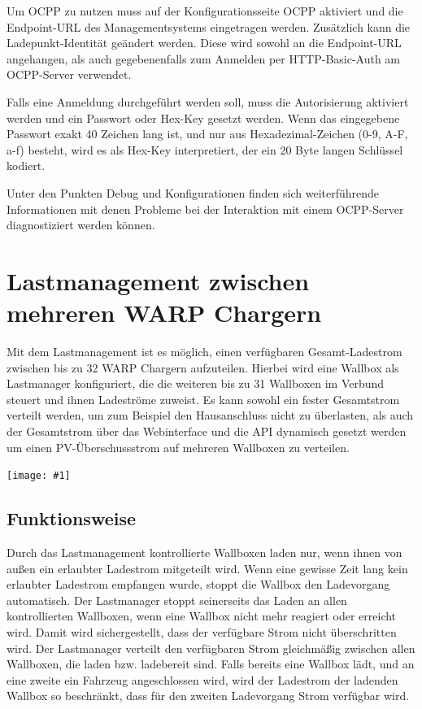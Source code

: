 \documentclass[a4paper,10pt]{article}
\newcommand{\gfx}[1]{\texttt{[image: \#1]}}
\begin{document}
\begin{multicols*}{2}
    Um OCPP zu nutzen muss auf der Konfigurationsseite OCPP aktiviert und die
    Endpoint-URL des Managementsystems eingetragen werden. Zusätzlich kann die Ladepunkt-Identität
    geändert werden. Diese wird sowohl an die Endpoint-URL angehangen, als auch gegebenenfalls zum
    Anmelden per HTTP-Basic-Auth am OCPP-Server verwendet.

    Falls eine Anmeldung durchgeführt werden soll, muss die Autorisierung aktiviert werden
    und ein Passwort oder Hex-Key gesetzt werden. Wenn das eingegebene Passwort exakt 40 Zeichen lang ist,
    und nur aus Hexadezimal-Zeichen (0-9, A-F, a-f) besteht, wird es als Hex-Key interpretiert, der ein 20
    Byte langen Schlüssel kodiert.

    Unter den Punkten Debug und Konfigurationen finden sich weiterführende Informationen mit denen Probleme
    bei der Interaktion mit einem OCPP-Server diagnostiziert werden können.

    \newpage
    \section{Lastmanagement zwischen mehreren WARP Chargern}\label{charge_manager}
    Mit dem Lastmanagement ist es möglich, einen verfügbaren Gesamt-Ladestrom
    zwischen bis zu 32 WARP Chargern aufzuteilen. Hierbei wird eine Wallbox als
    Lastmanager konfiguriert, die die weiteren bis zu 31 Wallboxen im Verbund steuert und ihnen Ladeströme
    zuweist. Es kann sowohl ein fester Gesamtstrom verteilt werden, um zum Beispiel den Hausanschluss nicht zu überlasten,
    als auch der Gesamtstrom über das Webinterface und die API dynamisch gesetzt werden
    um einen PV-Überschussstrom auf mehreren Wallboxen zu verteilen.

    \gfx{./img_warp2/resized/web_charge_manager}

    \subsection{Funktionsweise}
    Durch das Lastmanagement kontrollierte Wallboxen laden nur,
    wenn ihnen von außen ein erlaubter Ladestrom mitgeteilt wird. Wenn eine gewisse Zeit lang
    kein erlaubter Ladestrom empfangen wurde, stoppt die Wallbox den Ladevorgang automatisch.
    Der Lastmanager stoppt seinerseits das Laden an allen kontrollierten Wallboxen,
    wenn eine Wallbox nicht mehr reagiert oder erreicht wird. Damit wird sichergestellt,
    dass der verfügbare Strom nicht überschritten wird.
    Der Lastmanager verteilt den verfügbaren Strom gleichmäßig zwischen allen Wallboxen, die laden bzw. ladebereit sind.
    Falls bereits eine Wallbox lädt, und an eine zweite ein Fahrzeug angeschlossen wird,
    wird der Ladestrom der ladenden Wallbox so beschränkt, dass für den zweiten Ladevorgang Strom verfügbar wird.


\end{multicols*}
\end{document}
